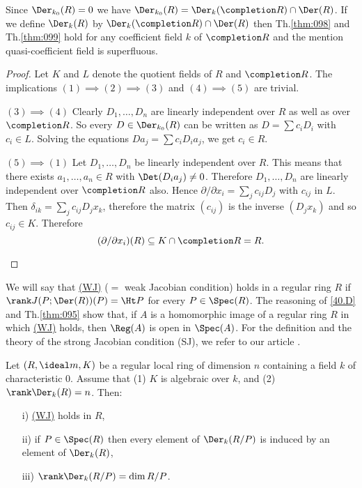 \documentclass[../main]{subfiles}
\begin{document}
\begin{remark}
Since $\Der_{k_0}(R) = 0$ we have $\Der_{k_0}(R) = \Der_k(\completion R) \cap \Der(R)$. If we define $\Der_k(R)$ by $\Der_k(\completion R) \cap \Der(R)$ then Th.\ref{thm:098} and Th.\ref{thm:099} hold for any coefficient field $k$ of $\completion R$ and the mention quasi-coefficient field is superfluous. 
\end{remark}

\begin{proof}
Let $K$ and $L$ denote the quotient fields of $R$ and $\completion R$. The implications $(1) \implies (2) \implies (3)$ and $(4) \implies (5)$ are trivial.
\begin{implyenumerate}
    \item[$(3) \implies (4)$] Clearly $D_1, \ldots, D_n$ are linearly independent over $R$ as well as over $\completion R$. So every $D \in \Der_{k_0}(R)$ can be written as $D = \sum c_i D_i$ with $c_i \in L$. Solving the equations $D a_j = \sum c_i D_i a_j$, we get $c_i \in R$. 
    \item[$(5) \implies (1)$] Let $D_1, \ldots, D_n$ be linearly independent over $R$. This means that there exists $a_1, \ldots, a_n \in R$ with $\Det(D_i a_j) \ne 0$. Therefore $D_1, \ldots, D_n$ are linearly independent over $\completion R$ also. Hence $\partial/\partial x_i = \sum_j c_{ij} D_j$ with $c_{ij}$ in $L$. Then $\delta_{ik} = \sum_j c_{ij} D_j x_k$, therefore the matrix $(c_{ij})$ is the inverse $(D_j x_k)$ and so $c_{ij} \in K$. Therefore \[(\partial/\partial x_i)(R) \subseteq K \cap \completion R = R.\]
\end{implyenumerate}
\end{proof}

\newparagraph We will say that \hyperref[40.F]{(WJ)} ($=$ weak Jacobian condition) holds in a regular ring $R$ if $\rank J(P; \Der(R))(P) = \Ht P$ for every $P \in \Spec(R)$. The reasoning of \ref{40.D} and Th.\ref{thm:095} show that, if $A$ is a homomorphic image of a regular ring $R$ in which \hyperref[40.F]{(WJ)} holds, then $\Reg(A)$ is open in $\Spec(A)$. For the definition and the theory of the strong Jacobian condition (SJ), we refer to our article \cite{MATSUMURA1977279}.

\begin{theorem}\label{thm:100}
Let $(R, \ideal m, K)$ be a regular local ring of dimension $n$ containing a field $k$ of characteristic $0$. Assume that (1) $K$ is algebraic over $k$, and (2) $\rank \Der_k(R) = n$. Then: 
\begin{enumerate}
    \item[i)] \hyperref[40.F]{(WJ)} holds in $R$,
    \item[ii)] if $P \in \Spec(R)$ then every element of $\Der_k(R/P)$ is induced by an element of $\Der_k(R)$,
    \item[iii)] $\rank \Der_k(R/P) = \dim R/P$.
\end{enumerate}
\end{theorem}
\end{document}
